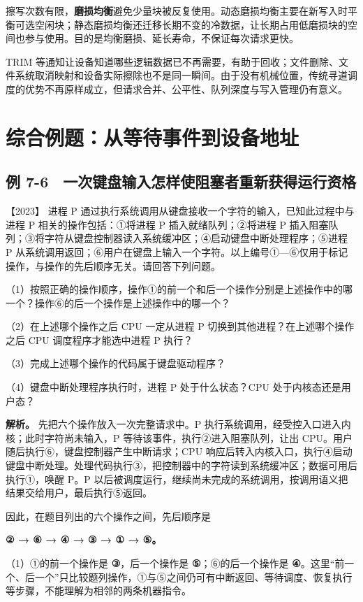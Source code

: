 擦写次数有限，\textbf{磨损均衡}避免少量块被反复使用。动态磨损均衡主要在新写入时平衡可选空闲块；静态磨损均衡还迁移长期不变的冷数据，让长期占用低磨损块的空间也参与使用。目的是均衡磨损、延长寿命，不保证每次请求更快。

TRIM 等通知让设备知道哪些逻辑数据已不再需要，有助于回收；文件删除、文件系统取消映射和设备实际擦除也不是同一瞬间。由于没有机械位置，传统寻道调度的优势不再原样成立，但请求合并、公平性、队列深度与写入管理仍有意义。

\section{综合例题：从等待事件到设备地址}\label{os-7-11}

\subsection{例 7-6　一次键盘输入怎样使阻塞者重新获得运行资格}\label{os-ex7-6}

\noindent{}【2023】 进程 P 通过执行系统调用从键盘接收一个字符的输入，已知此过程中与进程 P 相关的操作包括：①将进程 P 插入就绪队列；②将进程 P 插入阻塞队列；③将字符从键盘控制器读入系统缓冲区；④启动键盘中断处理程序；⑤进程 P 从系统调用返回；⑥用户在键盘上输入一个字符。以上编号①---⑥仅用于标记操作，与操作的先后顺序无关。请回答下列问题。

（1）按照正确的操作顺序，操作①的前一个和后一个操作分别是上述操作中的哪一个？操作⑥的后一个操作是上述操作中的哪一个？

（2）在上述哪个操作之后 CPU 一定从进程 P 切换到其他进程？在上述哪个操作之后 CPU 调度程序才能选中进程 P 执行？

（3）完成上述哪个操作的代码属于键盘驱动程序？

（4）键盘中断处理程序执行时，进程 P 处于什么状态？CPU 处于内核态还是用户态？


\textbf{解析。} 先把六个操作放入一次完整请求中。P 执行系统调用，经受控入口进入内核；此时字符尚未输入，P 等待该事件，执行②进入阻塞队列，让出 CPU。用户随后执行⑥，键盘控制器产生中断请求；CPU 响应后转入内核入口，执行④启动键盘中断处理。处理代码执行③，把控制器中的字符读到系统缓冲区；数据可用后执行①，唤醒 P。P 以后被调度运行，继续尚未完成的系统调用，按调用语义把结果交给用户，最后执行⑤返回。

因此，在题目列出的六个操作之间，先后顺序是

\textbf{② → ⑥ → ④ → ③ → ① → ⑤。}

（1）①的前一个操作是 \textbf{③}，后一个操作是 \textbf{⑤}；⑥的后一个操作是 \textbf{④}。这里``前一个、后一个''只比较题列操作，①与⑤之间仍可有中断返回、等待调度、恢复执行等步骤，不能理解为相邻的两条机器指令。

